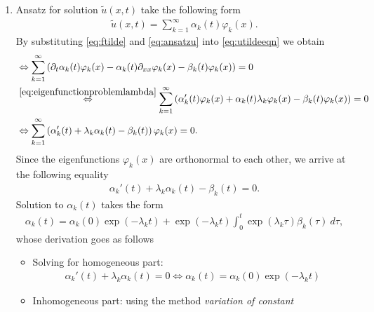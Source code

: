 \documentclass[12pt]{article}
\begin{document}
\begin{enumerate}
	\item Ansatz for solution $\tilde{u}(x,t)$ take the following form
	      \begin{align}
		      \label{eq:ansatzu}
		      \tilde{u}(x,t) = \sum_{k=1}^\infty \alpha_k(t) \varphi_k(x).
	      \end{align}
	      By substituting \eqref{eq:ftilde} and \eqref{eq:ansatzu} into \eqref{eq:utildeeqn} we obtain 
	      \begin{align}
		       & \Leftrightarrow 
		      \sum_{k=1}^\infty 
		      \left(
		      \partial_t \alpha_{k}(t) \varphi_k(x)
		      - \alpha_k(t) \partial_{xx} \varphi_k(x)
		      - \beta_k(t) \varphi_k(x)
		      \right)
		      = 0             \notag                                               \\
		       & \stackrel{\eqref{eq:eigenfunctionproblemlambda}}{\Leftrightarrow}
		      \sum_{k=1}^\infty 
		      \left( 
		      \alpha_{k}'(t) \varphi_k(x)
		      + \alpha_k(t) \lambda_k \varphi_k(x)
		      - \beta_k(t) \varphi_k(x)
		      \right)              
		      = 0             \notag                                               \\
		       & \Leftrightarrow 
		      \sum_{k=1}^\infty 
		      \left( \alpha_{k}'(t)  + \lambda_k\alpha_k(t) - \beta_k(t) \right) \varphi_k(x)
		      = 0.
	      \end{align}
	      Since the eigenfunctions $\varphi_{k}(x)$ are orthonormal to each other, 
	      we arrive at the following equality 
	      \begin{align}
		      \boxed{
			      \alpha_{k}'(t) + \lambda_k \alpha_k(t) - \beta_k(t) = 0.
		      }
	      \end{align}
	      Solution to $\alpha_k(t)$ takes the form
	      \begin{align*}
		      \alpha_k(t)
		      = \alpha_k(0) \exp(-\lambda_k t)
		      + \exp(-\lambda_k t) \int_0^t \exp(\lambda_k \tau) \beta_k(\tau) \ d\tau,
	      \end{align*}
	      whose derivation goes as follows
	      \begin{itemize}
		      \item Solving for homogeneous part:
		            \begin{align}
			            \alpha_{k}'(t) + \lambda_k \alpha_k(t) = 0 
			            \Leftrightarrow
			            \alpha_{k}(t) = \alpha_{k}(0)\exp(-\lambda_k t)
		            \end{align}
		      \item Inhomogeneous part: using the method \emph{variation of constant}
	      \end{itemize}
\end{enumerate}
\end{document}
